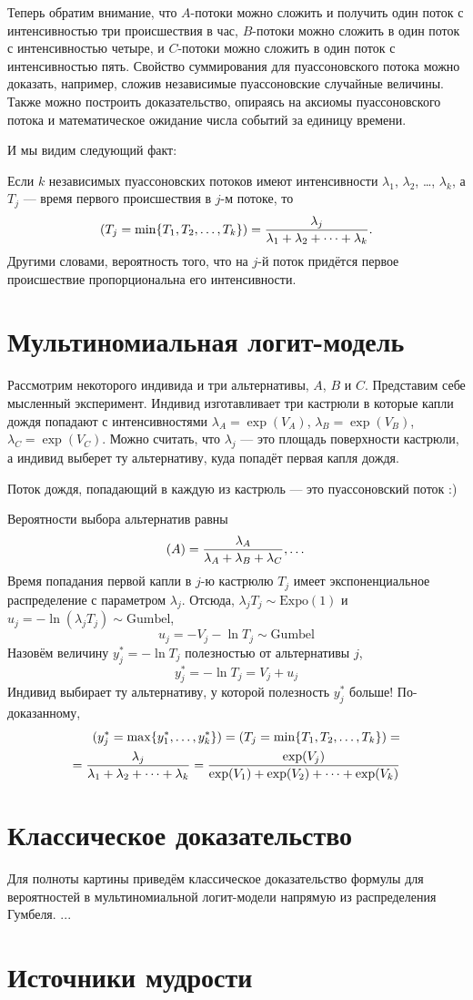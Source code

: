 \documentclass[12pt]{article}
\let\P\relax
\DeclareMathOperator{\P}{\mathbb{P}}
\newcommand{\dExpo}{\mathrm{Expo}} %
\newcommand{\dGumbel}{\mathrm{Gumbel}}
\begin{document}
Теперь обратим внимание, что $A$-потоки можно сложить и получить один поток с интенсивностью три
происшествия в час, $B$-потоки можно сложить в один поток с интенсивностью четыре,
и $C$-потоки можно сложить в один поток с интенсивностью пять. 
Свойство суммирования для пуассоновского потока можно доказать, например, сложив независимые пуассоновские случайные величины.
Также можно построить доказательство, опираясь на аксиомы пуассоновского потока и математическое ожидание числа событий за единицу времени.

И мы видим следующий факт:

\begin{tcolorbox}[colback=yellow!50!red!25!white]
Если $k$ независимых пуассоновских потоков имеют интенсивности $\lambda_1$, $\lambda_2$, \dots, $\lambda_k$,
а $T_j$ — время первого происшествия в $j$-м потоке, то
\[
\P(T_j = \min\{T_1, T_2, \dots, T_k\}) = \frac{\lambda_j}{\lambda_1 + \lambda_2 + \dots + \lambda_k}.
\]
Другими словами, вероятность того, что на $j$-й поток придётся первое происшествие пропорциональна его интенсивности.
\end{tcolorbox}
    

\section*{Мультиномиальная логит-модель}

Рассмотрим некоторого индивида и три альтернативы, $A$, $B$ и $C$. 
Представим себе мысленный эксперимент. 
Индивид изготавливает три кастрюли в которые капли дождя попадают с интенсивностями $\lambda_A = \exp(V_A)$, 
$\lambda_B = \exp(V_B)$, $\lambda_C = \exp(V_C)$.
Можно считать, что $\lambda_j$ — это площадь поверхности кастрюли, а индивид выберет ту альтернативу, куда попадёт первая капля дождя.

Поток дождя, попадающий в каждую из кастрюль — это пуассоновский поток :)

Вероятности выбора альтернатив равны 
\[
\P(A) = \frac{\lambda_A}{\lambda_A + \lambda_B + \lambda_C}, \dots
\]
Время попадания первой капли в $j$-ю кастрюлю $T_j$ имеет экспоненциальное распределение с параметром $\lambda_j$.
Отсюда, $\lambda_j T_j \sim \dExpo(1)$ и $u_j = -\ln (\lambda_j T_j) \sim \dGumbel$,
\[
u_j = -V_j - \ln T_j \sim \dGumbel
\]
Назовём величину $y_j^* = -\ln T_j$ полезностью от альтернативы $j$,
\[
y_j^* = -\ln T_j = V_j + u_j
\]
Индивид выбирает ту альтернативу, у которой полезность $y_j^*$ больше!
По-доказанному,
\begin{align*}
\P(y_j^* = \max\{y_1^*, \dots, y_k^*\}) = \P(T_j = \min\{T_1, T_2, \dots, T_k\}) = \\
= \frac{\lambda_j}{\lambda_1 + \lambda_2 + \dots + \lambda_k} = 
\frac{\exp(V_j)}{\exp(V_1) + \exp(V_2) + \dots + \exp(V_k)}
\end{align*}

\section*{Классическое доказательство}

Для полноты картины приведём классическое доказательство формулы для вероятностей в мультиномиальной логит-модели напрямую из распределения Гумбеля. 
...



\section{Источники мудрости}

\printbibliography
\end{document}
